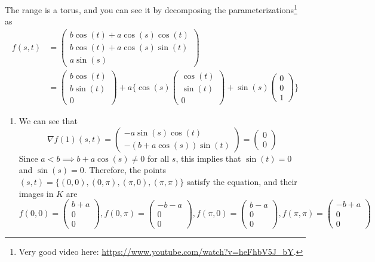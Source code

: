 	\begin{solution}
		The range is a torus, and you can see it by decomposing the parameterizations\footnote{Very good video here: \href{https://www.youtube.com/watch?v=heFhbV5J_bY}{https://www.youtube.com/watch?v=heFhbV5J\_bY}.} as 
		\begin{align}
			f(s, t) & = \begin{pmatrix} 
				b \cos(t) + a\cos(s) \cos(t) \\ 
				b \cos(t) + a\cos(s) \sin(t) \\ 
				a \sin(s) 
			\end{pmatrix} \\ 
							& = \begin{pmatrix} b \cos(t) \\ b \sin(t) \\ 0 \end{pmatrix}  + a \Bigg\{ \cos(s) \begin{pmatrix} \cos(t) \\ \sin(t) \\ 0 \end{pmatrix} + \sin(s) \begin{pmatrix} 0 \\ 0 \\ 1 \end{pmatrix} \Bigg\}
		\end{align}
		\begin{enumerate}
		  \item We can see that 
				\begin{equation}
					\nabla f(1) (s, t) = \begin{pmatrix} 
						-a \sin(s) \cos(t) \\ 
						- (b + a\cos(s)) \sin(t) 
					\end{pmatrix} = \begin{pmatrix} 0 \\ 0 \end{pmatrix} 
				\end{equation}
				Since $a < b \implies b + a \cos(s) \neq 0$ for all $s$, this implies that $\sin(t) = 0$ and $\sin(s) = 0$. Therefore, the points $(s, t) = \{ (0, 0), (0, \pi), (\pi, 0), (\pi, \pi) \}$ satisfy the equation, and their images in $K$ are 
				\begin{equation}
					f(0, 0) = \begin{pmatrix} b + a \\ 0 \\ 0 \end{pmatrix}, 
					f(0, \pi) = \begin{pmatrix} -b - a \\ 0 \\ 0 \end{pmatrix}, 
					f(\pi, 0) = \begin{pmatrix} b - a \\ 0 \\ 0 \end{pmatrix}, 
					f(\pi, \pi) = \begin{pmatrix} - b + a \\ 0 \\ 0 \end{pmatrix}
				\end{equation}


\end{enumerate}
\end{solution}
